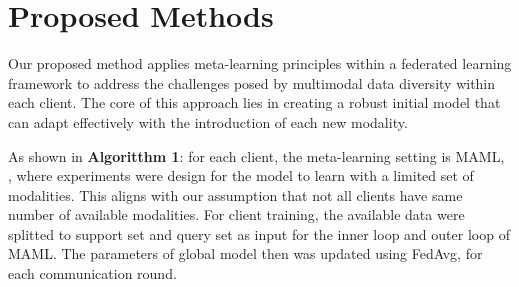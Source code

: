 \documentclass{article} %
\begin{document}



\section{Proposed Methods}
\label{headings}
Our proposed method applies meta-learning principles within a federated learning framework to address the challenges posed by multimodal data diversity within each client. The core of this approach lies in creating a robust initial model that can adapt effectively with the introduction of each new modality. 

As shown in \textbf{Algoritthm 1}: for each client, the meta-learning setting is MAML, \cite{maml}, where experiments were design for the model to learn with a limited set of modalities. This aligns with our assumption that not all clients have same number of available modalities. For client training, the available data were splitted to support set and query set as input for the inner loop and outer loop of MAML. The parameters of global model then was updated using FedAvg, \cite{fedavg} for each communication round.

\end{document}
